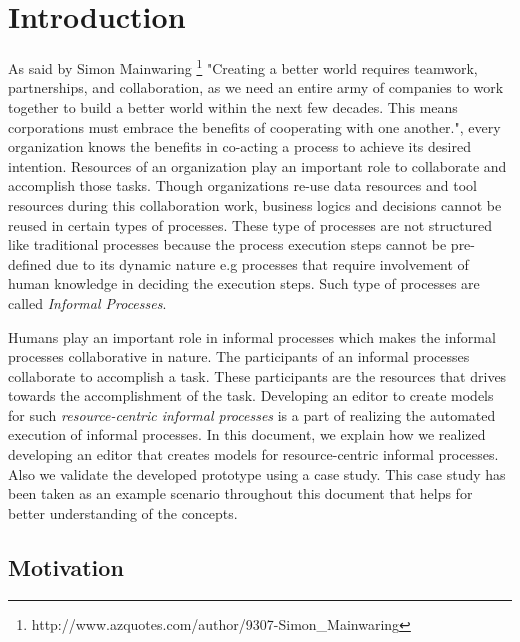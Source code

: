 \chapter{Introduction}
\label{chap:introduction}

As said by Simon Mainwaring  \footnote{http://www.azquotes.com/author/9307-Simon\_Mainwaring}  "Creating a better world requires teamwork, partnerships, and collaboration, as we need an entire army of companies to work together to build a better world within the next few decades. This means corporations must embrace the benefits of cooperating with one another.", every organization knows the benefits in co-acting a process to achieve its desired intention. Resources of an organization play an important role to collaborate and accomplish those tasks. Though organizations re-use data resources and tool resources during this collaboration work, business logics and decisions cannot be reused in certain types of processes. These type of processes are not structured like traditional processes because the process execution steps cannot be pre-defined due to its dynamic nature e.g processes that require involvement of human knowledge in deciding the execution steps\cite{Sungur2014}. Such type of processes are called \textit{Informal Processes}.

Humans play an important role in informal processes which makes the informal processes collaborative in nature. The participants of an informal processes collaborate to accomplish a task. These participants are the resources that drives towards the accomplishment of the task.  Developing an editor to create models for such \textit{resource-centric informal processes} is a part of realizing the automated execution of informal processes. In this document, we explain how we realized developing an editor that creates models for resource-centric informal processes. Also we validate the developed prototype using a case study. This case study has been taken as an example scenario throughout this document that helps for better understanding of the concepts.


\section{Motivation}
\label{sec:motivation}

